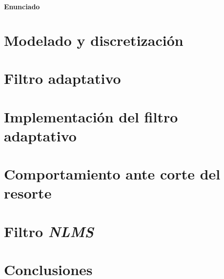 \documentclass[10pt,a4paper]{article}
\begin{document}
		
	\setcounter{page}{1}

\begin{center}{\Large{\textbf{Enunciado}}}\end{center}
%	

	
	
	\section{Modelado y discretización}\label{sec:ej1}
	
		
	\section{Filtro adaptativo}\label{sec:ej2}
	

	\section{Implementación del filtro adaptativo}\label{sec:ej3}
		

	\section{Comportamiento ante corte del resorte}\label{sec:ej4}
		

	\section{Filtro \emph{NLMS}}\label{sec:ej5}
		

	\section{Conclusiones}\label{sec:conclusiones}
		

\end{document}
